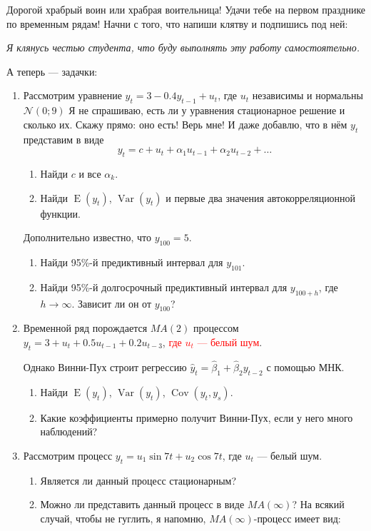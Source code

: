 \documentclass[12pt]{article}
\DeclareMathOperator{\Cov}{Cov}
\DeclareMathOperator{\Var}{Var}
\DeclareMathOperator{\E}{E}
\def \cN{\mathcal{N}}
\begin{document}
Дорогой храбрый воин или храбрая воительница! Удачи тебе на первом празднике по временным рядам!
Начни с того, что напиши клятву и подпишись под ней:

\vspace{10pt}
\textit{Я клянусь честью студента, что буду выполнять эту работу самостоятельно.}
\vspace{10pt}


А теперь — задачки:


\begin{enumerate}

\item Рассмотрим уравнение $y_t = 3 - 0.4y_{t-1} + u_t$, где $u_t$ независимы и нормальны $\cN(0; 9)$
Я не спрашиваю, есть ли у уравнения стационарное решение и сколько их.  
Скажу прямо: оно есть! Верь мне! И даже добавлю, что в нём $y_t$ представим в виде 
\[
	y_t = c + u_t + \alpha_1 u_{t-1} + \alpha_2 u_{t-2} + \ldots
\]

\begin{enumerate}
	\item Найди $c$ и все $\alpha_k$.
	\item Найди $\E(y_t)$, $\Var(y_t)$ и первые два значения автокорреляционной функции. 
\end{enumerate}
Дополнительно известно, что $y_{100}=5$.
\begin{enumerate}[resume]
	\item Найди 95\%-й предиктивный интервал для $y_{101}$. 
	\item Найди 95\%-й долгосрочный предиктивный интервал для $y_{100+h}$, 
	где $h \to \infty$. Зависит ли он от $y_{100}$?
\end{enumerate}
	


\item Временной ряд порождается $MA(2)$ процессом $y_t = 3 + u_t + 0.5u_{t-1} + 0.2 u_{t-3}$, 
\textcolor{red}{где $u_t$ — белый шум}.

Однако Винни-Пух строит регрессию $\hat y_t = \hat\beta_1 + \hat\beta_2 y_{t-2}$ с помощью МНК.

\begin{enumerate}
	\item Найди $\E(y_t)$, $\Var(y_t)$, $\Cov(y_t, y_s)$.
	\item Какие коэффициенты примерно получит Винни-Пух, если у него много наблюдений?
\end{enumerate}


\item Рассмотрим процесс $y_t = u_1 \sin 7t + u_2 \cos 7t$, где $u_t$ — белый шум.
\begin{enumerate}
	\item Является ли данный процесс стационарным?
	\item Можно ли представить данный процесс в виде $MA(\infty)$? 
	На всякий случай, чтобы не гуглить, я напомню, $MA(\infty)$-процесс имеет вид:


\end{enumerate}
\end{enumerate}
\end{document}
